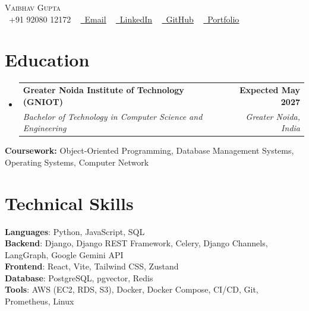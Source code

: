 \documentclass[letterpaper,10pt]{article}
\makeatletter
\newcommand{\resumeSubheading}[4]{
  \vspace{-2pt}\item
    \begin{tabular*}{1.0\textwidth}[t]{l@{\extracolsep{\fill}}r}
      \textbf{#1} & \textbf{\small #2} \\
      \textit{\small#3} & \textit{\small #4} \\
    \end{tabular*}\vspace{-7pt}
}
\newcommand{\resumeSubHeadingListStart}{\begin{itemize}[leftmargin=0.0in, label={}]}
\newcommand{\resumeSubHeadingListEnd}{\end{itemize}}
\makeatother
\begin{document}

\begin{center}
    {\Huge \scshape Vaibhav Gupta} \\ \vspace{1pt}
    \small \raisebox{-0.1\height}\faPhone\ +91 92080 12172 ~
    \href{mailto:vaibhv19.business@gmail.com}{\raisebox{-0.2\height}\faEnvelope\ \underline{Email}} ~
    \href{https://linkedin.com/in/vaibhv19}{\raisebox{-0.2\height}\faLinkedin\ \underline{LinkedIn}} ~
    \href{https://github.com/vaibhv19}{\raisebox{-0.2\height}\faGithub\ \underline{GitHub}} ~
    \href{https://vaibhv19.dev}{\raisebox{-0.2\height}\faGlobe\ \underline{Portfolio}}
    \vspace{-8pt}
\end{center}

\section{Education}
  \resumeSubHeadingListStart
    \resumeSubheading
      {Greater Noida Institute of Technology (GNIOT)}{Expected May 2027}
      {Bachelor of Technology in Computer Science and Engineering}{Greater Noida, India}
  \resumeSubHeadingListEnd
  \vspace{-4pt}
  \begin{itemize}[leftmargin=0in, label={}]
    \small{\item{\textbf{Coursework:} Object-Oriented Programming, Database Management Systems, Operating Systems, Computer Network}}
    \vspace{-10pt}
\end{itemize}

\section{Technical Skills}
 \begin{itemize}[leftmargin=0in, label={}]
    \small{\item{
     \textbf{Languages}{: Python, JavaScript, SQL} \\
     \textbf{Backend}{: Django, Django REST Framework, Celery, Django Channels, LangGraph, Google Gemini API} \\
     \textbf{Frontend}{: React, Vite, Tailwind CSS, Zustand} \\
     \textbf{Database}{: PostgreSQL, pgvector, Redis} \\
     \textbf{Tools}{: AWS (EC2, RDS, S3), Docker, Docker Compose, CI/CD, Git, Prometheus, Linux} \\
    }}
 \end{itemize}
 \vspace{-12pt}
\end{document}
